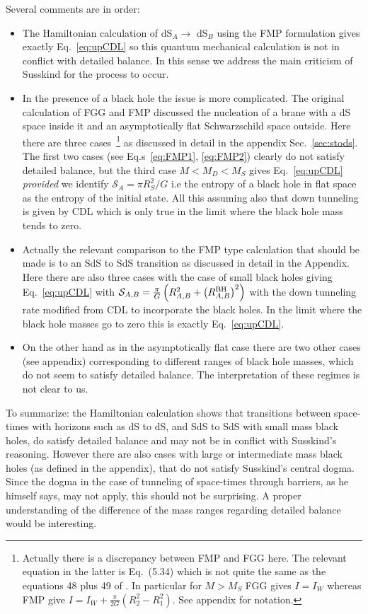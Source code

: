 \documentclass[a4paper,11pt]{article}
\numberwithin{equation}{section}
\newcommand{\citep}{\cite}
\def\S{\mathcal S}
\numberwithin{equation}{section}
\begin{document}
Several comments are in order:
\begin{itemize}
\item The Hamiltonian calculation of dS$_{A}\rightarrow$ dS$_{B}$ using the
FMP\citep{Fischler:1990pk} formulation gives exactly Eq.~\eqref{eq:upCDL}
\citep{DeAlwis:2019rxg} so this quantum mechanical calculation is
not in conflict with detailed balance. In this sense we address the main criticism of Susskind for the process to occur.

\item In the presence of a black hole the issue is more complicated. The
original calculation of FGG and FMP discussed the nucleation of a
brane with a dS space inside it and an asymptotically flat Schwarzschild space outside. Here there are three cases~\citep{Fischler:1990pk}\footnote{Actually there is a discrepancy between FMP and FGG here. The relevant equation in the latter \citep{Farhi:1989yr} is Eq.~(5.34) which is not quite the same as the equations 48 plus 49 of \citep{Fischler:1990pk}. In particular for $M>M_{S}$ FGG gives $I=I_{W}$ whereas FMP give
$I=I_{W}+\frac{\pi}{2G}\left(R_{2}^{2}-R_{1}^{2}\right)$. See appendix
for notation.} as discussed in detail in the appendix  Sec.~\ref{sec:stods}. The first two cases (see Eq.s~\eqref{eq:FMP1}, \eqref{eq:FMP2}) clearly do not satisfy detailed balance, but the third case $M<M_{D}<M_{S}$ gives  Eq.~\eqref{eq:upCDL} \textit{provided} we identify $\S_{A}=\pi R_{S}^{2}/G$ i.e the entropy of a black hole in flat space as the entropy of the initial state. All this assuming also that down tunneling is given by CDL which is only true in the limit where the black hole mass tends to zero.

\item Actually the relevant comparison to the FMP type calculation that should be made is to an SdS to SdS transition as discussed in detail in the Appendix. Here there are also  three cases with the case of small black holes giving Eq.~\eqref{eq:upCDL} with $\S_{A,B}=\frac{\pi}{G}\left(R_{A,B}^{2}+\left(R_{A,B}^{{\rm BH}}\right)^{2}\right)$ with the down tunneling rate modified from CDL to incorporate the black holes. In the limit where the black hole masses go to zero this
is exactly Eq.~\eqref{eq:upCDL}.

\item On the other hand as in the asymptotically flat case there are two other cases (see appendix) corresponding to different ranges of black hole masses,    which do not seem to satisfy detailed balance. The interpretation of these regimes is not clear to us.
\end{itemize}
To summarize: the Hamiltonian calculation shows that  transitions
between space-times with horizons such as dS to dS, and SdS to SdS
with small mass black holes, do satisfy detailed balance and may not be in conflict with Susskind's reasoning. However there
are also cases with large or intermediate mass black holes (as defined in the appendix), that do not satisfy Susskind's central dogma. Since the dogma in the case of tunneling of space-times through barriers, as he himself says, may not apply, this should not be surprising. A proper understanding of the difference of the mass ranges regarding detailed balance would be interesting.
\end{document}
